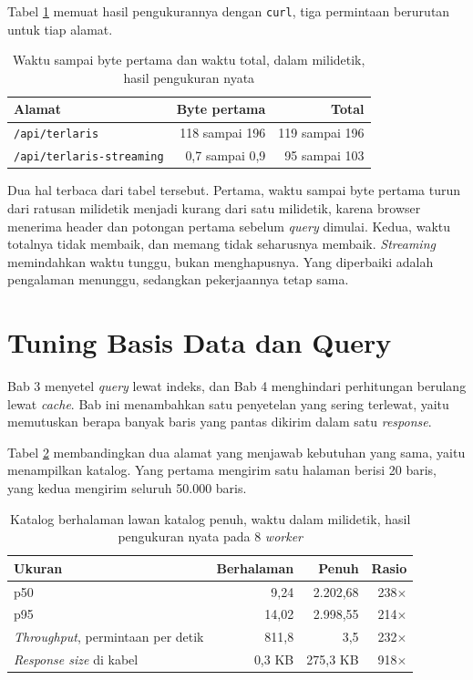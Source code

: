 Tabel \ref{tab:streaming} memuat hasil pengukurannya dengan \texttt{curl},
tiga permintaan berurutan untuk tiap alamat.

\begin{table}[!htb]
  \centering
  \caption{Waktu sampai byte pertama dan waktu total, dalam milidetik, hasil
           pengukuran nyata}
  \label{tab:streaming}
  \begin{tabularx}{\textwidth}{Xrr}
    \hline
    \textbf{Alamat} & \textbf{Byte pertama} & \textbf{Total} \\
    \hline
    \texttt{/api/terlaris} & 118 sampai 196 & 119 sampai 196 \\
    \hline
    \texttt{/api/terlaris-streaming} & 0,7 sampai 0,9 & 95 sampai 103 \\
    \hline
  \end{tabularx}
\end{table}

Dua hal terbaca dari tabel tersebut. Pertama, waktu sampai byte pertama turun
dari ratusan milidetik menjadi kurang dari satu milidetik, karena browser
menerima header dan potongan pertama sebelum \textit{query} dimulai. Kedua, waktu
totalnya tidak membaik, dan memang tidak seharusnya membaik. \textit{Streaming}
memindahkan waktu tunggu, bukan menghapusnya. Yang diperbaiki adalah
pengalaman menunggu, sedangkan pekerjaannya tetap sama.

\section{Tuning Basis Data dan Query}

Bab 3 menyetel \textit{query} lewat indeks, dan Bab 4 menghindari perhitungan berulang
lewat \textit{cache}. Bab ini menambahkan satu penyetelan yang sering
terlewat, yaitu memutuskan berapa banyak baris yang pantas dikirim dalam satu
\textit{response}.

Tabel \ref{tab:katalog} membandingkan dua alamat yang menjawab kebutuhan yang
sama, yaitu menampilkan katalog. Yang pertama mengirim satu halaman berisi 20
baris, yang kedua mengirim seluruh 50.000 baris.

\begin{table}[!htb]
  \centering
  \caption{Katalog berhalaman lawan katalog penuh, waktu dalam milidetik,
           hasil pengukuran nyata pada 8 \textit{worker}}
  \label{tab:katalog}
  \begin{tabularx}{\textwidth}{Xrrr}
    \hline
    \textbf{Ukuran} & \textbf{Berhalaman} & \textbf{Penuh} & \textbf{Rasio} \\
    \hline
    p50 & 9,24 & 2.202,68 & 238$\times$ \\
    \hline
    p95 & 14,02 & 2.998,55 & 214$\times$ \\
    \hline
    \textit{Throughput}, permintaan per detik & 811,8 & 3,5 & 232$\times$ \\
    \hline
    \textit{Response size} di kabel & 0,3 KB & 275,3 KB & 918$\times$ \\
    \hline
  \end{tabularx}
\end{table}

